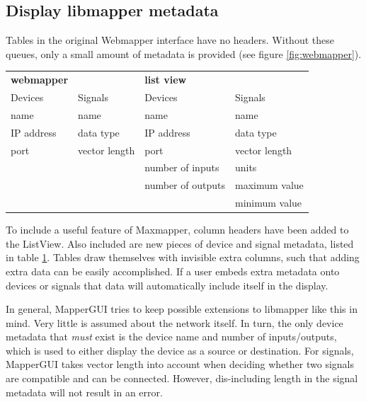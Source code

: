	
	\subsection{Display libmapper metadata} %
	\label{sub:display_libmapper_metadata}

Tables in the original Webmapper interface have no headers. Without these queues, only a small amount of metadata is provided (see figure \ref{fig:webmapper}).

\begin{table}
	\centering
	\label{tab:webmapper_list_view_metadata}
		\begin{tabular}{l  l  |  l l }
		\hline\hline
		\textbf{webmapper}&&\textbf{list view}\\
		Devices&Signals&Devices&Signals\\
		\hline
		name&name&name&name\\
		IP address&data type&IP address&data type\\
		port&vector length&port&vector length\\
		&&number of inputs&units\\
		&&number of outputs&maximum value\\
		&&&minimum value\\
		\end{tabular}
\end{table}

To include a useful feature of Maxmapper, column headers have been added to the ListView. Also included are new pieces of device and signal metadata, listed in table \ref{tab:webmapper_list_view_metadata}. Tables draw themselves with invisible extra columns, such that adding extra data can be easily accomplished. If a user embeds extra metadata onto devices or signals that data will automatically include itself in the display.  

In general, MapperGUI tries to keep possible extensions to libmapper like this in mind. Very little is assumed about the network itself. In turn, the only device metadata that \emph{must} exist is the device name and number of inputs/outputs, which is used to either display the device as a source or destination. For signals, MapperGUI takes vector length into account when deciding whether two signals are compatible and can be connected. However, dis-including length in the signal metadata will not result in an error.
	
